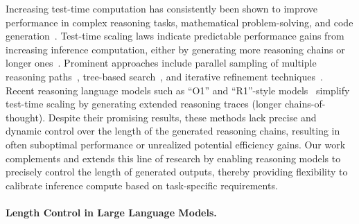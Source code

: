 Increasing test-time computation has consistently been shown to improve performance in complex reasoning tasks, mathematical problem-solving, and code generation~\citep{wu2024inferencescalinglawsempirical, wang2023selfconsistencyimproveschainthought, wei2023chainofthoughtpromptingelicitsreasoning, deepseekai2025deepseekr1incentivizingreasoningcapability, snell2024scalingllmtesttimecompute}. 
Test-time scaling laws indicate predictable performance gains from increasing inference computation, either by generating more reasoning chains or longer ones~\citep{wu2024inferencescalinglawsempirical, snell2024scalingllmtesttimecompute,openai2024openaio1card}.
Prominent approaches include parallel sampling of multiple reasoning paths~\citep{wang2023selfconsistencyimproveschainthought,aggarwal2023letssamplestepstep}, tree-based search~\citep{yao2023treethoughtsdeliberateproblem,wu2024inferencescalinglawsempirical,xin2024deepseekproverv15harnessingproofassistant}, and iterative refinement techniques~\citep{welleck2023generating,madaan2023selfrefineiterativerefinementselffeedback,snell2024scalingllmtesttimecompute,welleck2024decodingmetagenerationinferencetimealgorithms}.  
Recent reasoning language models such as ``O1'' and ``R1''-style models~\citep{openai2024openaio1card, deepseekai2025deepseekr1incentivizingreasoningcapability} simplify test-time scaling by generating extended reasoning traces (longer chains-of-thought).   
Despite their promising results, these methods lack precise and dynamic control over the length of the generated reasoning chains, resulting in often suboptimal performance or unrealized potential efficiency gains.
Our work complements and extends this line of research by enabling reasoning models to precisely control the length of generated outputs, thereby providing flexibility to calibrate inference compute based on task-specific requirements.

\paragraph{Length Control in Large Language Models.}

